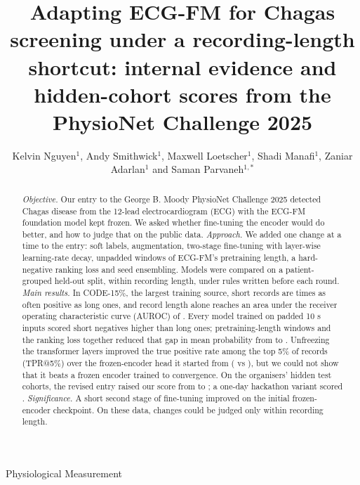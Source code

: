 \documentclass{iopjournal}
\makeatletter
\newcommand{\tpr}{TPR@5\%}
\renewcommand{\articletype}[1]{{\vspace*{-8mm}\noindent \Large \sf Physiological Measurement}

\vspace{4mm}\noindent{\scriptsize \sf{\bfseries \MakeUppercase{#1}}}}
\makeatother
\begin{document}
\articletype{Paper}

\title{Adapting ECG-FM for Chagas screening under a recording-length shortcut: internal evidence and hidden-cohort scores from the PhysioNet Challenge 2025}

\author{Kelvin Nguyen$^1$, Andy Smithwick$^1$, Maxwell Loetscher$^1$, Shadi Manafi$^1$, Zaniar Adarlan$^1$ and Saman Parvaneh$^{1,*}$}






\begin{abstract}
\textit{Objective.} Our entry to the George B. Moody PhysioNet Challenge 2025 detected Chagas disease from the 12-lead electrocardiogram (ECG) with the ECG-FM foundation model kept frozen. We asked whether fine-tuning the encoder would do better, and how to judge that on the public data.
\textit{Approach.} We added one change at a time to the entry: soft labels, augmentation, two-stage fine-tuning with layer-wise learning-rate decay, unpadded windows of ECG-FM's pretraining length, a hard-negative ranking loss and seed ensembling. Models were compared on a patient-grouped held-out split, within recording length, under rules written before each round.
\textit{Main results.} In CODE-15\%, the largest training source, short records are \prevRatio{} times as often positive as long ones, and record length alone reaches an area under the receiver operating characteristic curve (AUROC) of \durOnlyB. Every model trained on padded 10 s inputs scored short negatives higher than long ones; pretraining-length windows and the ranking loss together reduced that gap in mean probability from \rThreeBzGap{} to \rThreeWoneRGap. Unfreezing the transformer layers improved the true positive rate among the top 5\% of records (\tpr) over the frozen-encoder head it started from (\mwSseven{} vs \frozenSseven), but we could not show that it beats a frozen encoder trained to convergence. On the organisers' hidden test cohorts, the revised entry raised our score from \extOrigMean{} to \extNewMean; a one-day hackathon variant scored \extHackMean.
\textit{Significance.} A short second stage of fine-tuning improved on the initial frozen-encoder checkpoint. On these data, changes could be judged only within recording length.
\end{abstract}
\end{document}

